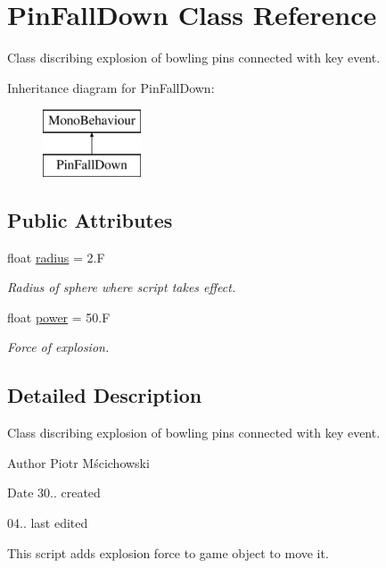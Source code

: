 \hypertarget{class_pin_fall_down}{}\section{Pin\+Fall\+Down Class Reference}
\label{class_pin_fall_down}


Class discribing explosion of bowling pins connected with key event.  


Inheritance diagram for Pin\+Fall\+Down\+:\begin{figure}[H]
\begin{center}
\leavevmode
\includegraphics[height=2.000000cm]{class_pin_fall_down}
\end{center}
\end{figure}
\subsection*{Public Attributes}
\begin{DoxyCompactItemize}
\item 
float \hyperlink{class_pin_fall_down_aa89b8c30295e795a3355e45fd4def19e}{radius} = 2.\+F
\begin{DoxyCompactList}\small\item\em Radius of sphere where script takes effect. \end{DoxyCompactList}\item 
float \hyperlink{class_pin_fall_down_a8658bded276508aad0b6297af75b5d56}{power} = 50.\+F
\begin{DoxyCompactList}\small\item\em Force of explosion. \end{DoxyCompactList}\end{DoxyCompactItemize}


\subsection{Detailed Description}
Class discribing explosion of bowling pins connected with key event. 

\begin{DoxyAuthor}{Author}
Piotr Mścichowski 
\end{DoxyAuthor}
\begin{DoxyDate}{Date}
30.. created 

04.. last edited
\end{DoxyDate}
This script adds explosion force to game object to move it. 

